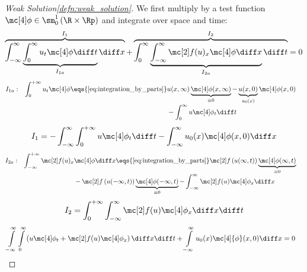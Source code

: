 \begin{proofbox}\nospacing
    \begin{proof}[Weak Solution\cref{defn:weak_solution}]\label{proof:defn:weak_solution}
        We first multiply \label{eq:conservation_law1D} by a test function $\testfunc\in\sm_{0}^{1}\left(\R\times\Rp\right)$
        and integrate over space and time:
        \begin{align*}
          \overbrace{\int_{-\infty}^{\infty}\underbrace{\int_{0}^{\infty}u_{t}\testfunc\diff t}_{I_{1a}}\diff x}^{I_{1}}+
          \overbrace{\int_{0}^{\infty}\underbrace{\int_{-\infty}^{\infty}\flux(u)_{x}\testfunc\diff x}_{I_{2a}}\diff t}^{I_{2}}=0
        \end{align*}
        \begin{align*}
            I_{1a}:&&\int_{0}^{+\infty}u_{t}\testfunc\eqs{\text{\cref{eq:integration_by_parts}}}&u(x,\infty)\underbrace{\testfunc(x,\infty)}_{\equiv0}-
            \underbrace{u(x,0)}_{u_{0}(x)}\testfunc(x,0)&&\\[-1\jot]
            &&&-\int_{0}^{\infty}u\testfunc_{t}\diff t&&
        \end{align*}
        \begin{align*}
          I_{1}=-\int_{-\infty}^{\infty}\int_{0}^{+\infty}u\testfunc_{t}\diff t
          -\int_{-\infty}^{\infty} u_{0}(x)\testfunc(x,0)\diff x
        \end{align*}
        \begin{align*}
          I_{2a}:&&\int_{-\infty}^{+\infty}\flux(u)_{x}&\testfunc\diff x\eqs{\text{\cref{eq:integration_by_parts}}}\flux\left(u(\infty,t)\right)
                                                                         \underbrace{\testfunc(\infty,t)}_{\equiv0}&&\\[-1\jot]
                 &&&-\flux\left(u(-\infty,t)\right)\underbrace{\testfunc(-\infty,t)}_{\equiv0}-\int_{-\infty}^{\infty}\flux(u)\testfunc_{x}\diff x&&
        \end{align*}
        \begin{align*}
            I_{2}=\int_{0}^{+\infty}\int_{-\infty}^{\infty}\flux(u)\testfunc_{x}\diff x\diff t
        \end{align*}
        \begin{align*}
            &\int\limits_{-\infty}^\infty\int\limits_0^{\infty}
            \left(u\testfunc_{t}+\flux(u)\testfunc_{x}\right)
            \diff x \diff t+\int\limits_{-\infty}^\infty u_0(x)\mc[4]{\phi}(x,0)\diff x=0
        \end{align*}
    \end{proof}
\end{proofbox}


